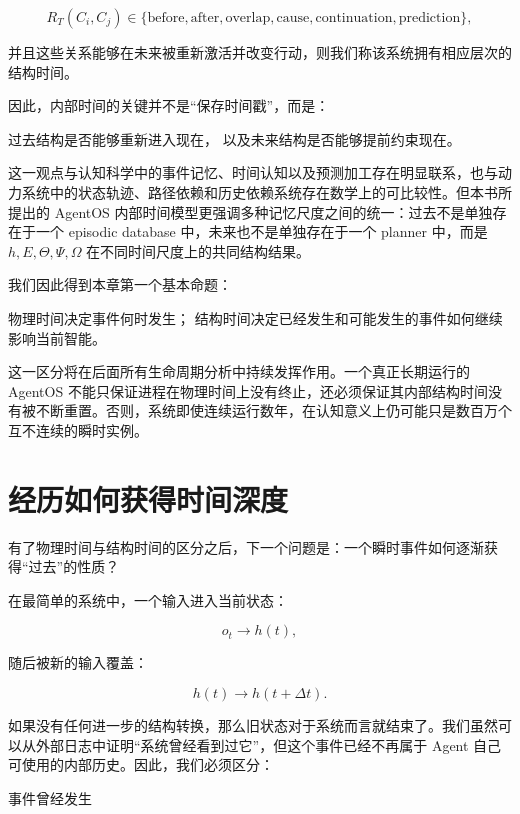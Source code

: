 \[
R_T(C_i,C_j)
\in
\{
\text{before},
\text{after},
\text{overlap},
\text{cause},
\text{continuation},
\text{prediction}
\},
\]

并且这些关系能够在未来被重新激活并改变行动，则我们称该系统拥有相应层次的结构时间。

因此，内部时间的关键并不是“保存时间戳”，而是：

\begin{statementbox}
过去结构是否能够重新进入现在，
以及未来结构是否能够提前约束现在。
\end{statementbox}

这一观点与认知科学中的事件记忆、时间认知以及预测加工存在明显联系，也与动力系统中的状态轨迹、路径依赖和历史依赖系统存在数学上的可比较性。但本书所提出的 AgentOS 内部时间模型更强调多种记忆尺度之间的统一：过去不是单独存在于一个 episodic database 中，未来也不是单独存在于一个 planner 中，而是 $h,E,\Theta,\Psi,\Omega$ 在不同时间尺度上的共同结构结果。

我们因此得到本章第一个基本命题：

\begin{proposition*}
物理时间决定事件何时发生；
结构时间决定已经发生和可能发生的事件如何继续影响当前智能。
\end{proposition*}

这一区分将在后面所有生命周期分析中持续发挥作用。一个真正长期运行的 AgentOS 不能只保证进程在物理时间上没有终止，还必须保证其内部结构时间没有被不断重置。否则，系统即使连续运行数年，在认知意义上仍可能只是数百万个互不连续的瞬时实例。

\section{经历如何获得时间深度}

有了物理时间与结构时间的区分之后，下一个问题是：一个瞬时事件如何逐渐获得“过去”的性质？

在最简单的系统中，一个输入进入当前状态：

\[
o_t
\rightarrow
h(t),
\]

随后被新的输入覆盖：

\[
h(t)
\rightarrow
h(t+\Delta t).
\]

如果没有任何进一步的结构转换，那么旧状态对于系统而言就结束了。我们虽然可以从外部日志中证明“系统曾经看到过它”，但这个事件已经不再属于 Agent 自己可使用的内部历史。因此，我们必须区分：

\begin{statementbox}
事件曾经发生
\end{statementbox}

